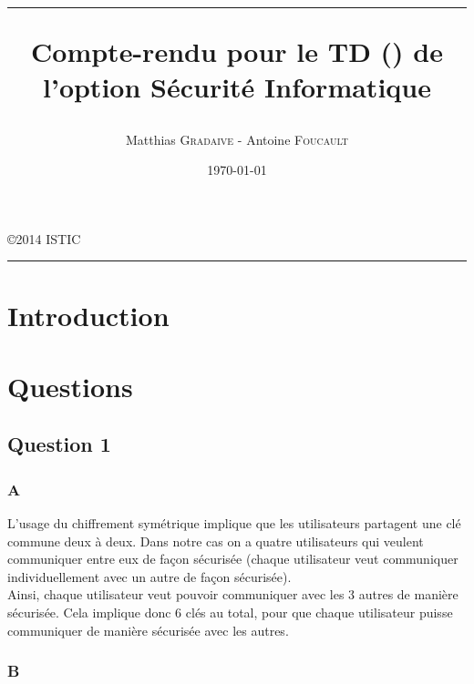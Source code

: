 \documentclass[a4paper, 11pt, oneside]{article}
\title{\hrule \vspace{1cm} Compte-rendu pour le TD (\no2) de l'option Sécurité Informatique}
\author{Matthias \textsc{Gradaive} - Antoine \textsc{Foucault}}
\date{\today}
\begin{document}
\pagestyle{fancy}
\lhead{}
\chead{}
\rhead{\leftmark}
\cfoot{}

\clearpage
\thispagestyle{empty}

\maketitle
\begin{center}
 \copyright 2014 ISTIC\\
\end{center}
\vspace{1cm}
\hrule
\thispagestyle{empty}

\newpage

\renewcommand{\contentsname}{Sommaire}
\tableofcontents
\thispagestyle{empty}
\newpage
\setcounter{page}{1}

\section*{Introduction}



\section{Questions}

\subsection{Question 1}

\subsubsection{A}

L'usage du chiffrement symétrique implique que les utilisateurs partagent une clé commune deux à deux. Dans notre cas on a quatre utilisateurs qui veulent communiquer entre eux de façon sécurisée (chaque utilisateur veut communiquer individuellement avec un autre de façon sécurisée).\\
Ainsi, chaque utilisateur veut pouvoir communiquer avec les 3 autres de manière sécurisée. Cela implique donc 6 clés au total, pour que chaque utilisateur puisse communiquer de manière sécurisée avec les autres.

\subsubsection{B}
\end{document}

